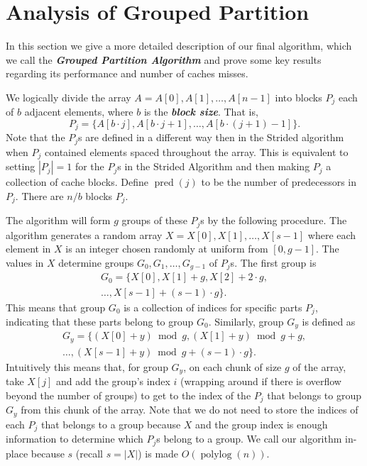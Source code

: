 \documentclass[twocolumn, twoside, 12pt]{article}
\def\polylog{\operatorname{polylog}}
\def\pred{\operatorname{pred}}
\newcommand{\defn}[1]       {{\textit{\textbf{\boldmath #1}}}}
\renewcommand{\paragraph}[1]{\vspace{0.09in}\noindent{\bf \boldmath #1.}}
\begin{document}
\section{Analysis of Grouped Partition}
In this section we give a more detailed description of our final algorithm, which we call the \defn{Grouped Partition Algorithm} and prove some key results regarding its performance and number of caches misses. 

\paragraph{Algorithm Overview}
We logically divide the array $A = A[0],A[1],\ldots, A[n-1]$ into blocks $P_j$ each of $b$ adjacent elements, where $b$ is the \defn{block size}.
That is, 
$$P_j = \{A[b\cdot j], A[b\cdot j + 1], \ldots, A[b\cdot (j+1)-1]\}.$$
Note that the $P_j$s are defined in a different way then in the Strided algorithm when $P_j$ contained elements spaced throughout the array.
This is equivalent to setting $|P_j| = 1$ for the $P_j$s in the Strided Algorithm and then making $P_j$ a collection of cache blocks.
Define \defn{$\pred(j)$} to be the number of predecessors in $P_j$.
There are $n/b$ blocks $P_j$.

The algorithm will form $g$ groups of these $P_j$s by the following procedure. 
The algorithm generates a random array $X=X[0],X[1],\ldots,X[s-1]$ where each element in $X$ is an integer chosen randomly at uniform from $[0,g-1]$.
The values in $X$ determine groups $G_0, G_1, \ldots, G_{g-1}$ of $P_j$s.
The first group is 
\begin{multline*}
	G_0 = \{X[0], X[1]+g, X[2]+2\cdot g,\\ 
	\ldots,X[s-1]+ (s-1)\cdot g\}.
\end{multline*}
This means that group $G_0$ is a collection of indices for specific parts $P_j$, indicating that these parts belong to group $G_0$. Similarly, group $G_y$ is defined as 
\begin{multline*}
	G_y = \{(X[0]+y) \bmod g, (X[1]+y) \bmod g + g, \\
	\ldots, (X[s-1]+y) \bmod g + (s-1)\cdot g \}.
\end{multline*}
Intuitively this means that, for group $G_y$, on each chunk of size $g$ of the array, take $X[j]$ and add the group's index $i$ (wrapping around if there is overflow beyond the number of groups) to get to the index of the $P_j$ that belongs to group $G_y$ from this chunk of the array.
Note that we do not need to store the indices of each $P_j$ that belongs to a group because $X$ and the group index is enough information to determine which $P_j$s belong to a group.
We call our algorithm in-place because $s$ (recall $s = |X|$) is made $O(\polylog(n))$.
\end{document}
